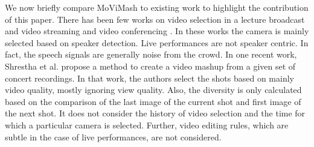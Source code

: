\documentclass{sig-alternate-05-2015}
\begin{document}
We now briefly compare MoViMash to existing work to highlight the contribution of this paper. There has been few works on
video selection in a lecture broadcast and video streaming \cite{21} \cite{6}
and video conferencing \cite{ref3}. In these works the camera is mainly
selected based on speaker detection. Live performances are not
speaker centric. In fact, the speech signals are generally noise from
the crowd. In one recent work, Shrestha et al.\cite{15} propose a
method to create a video mashup from a given set of concert recordings. In that work, the authors select the shots based on mainly
video quality, mostly ignoring view quality. Also, the diversity is
only calculated based on the comparison of the last image of the
current shot and first image of the next shot. It does not consider
the history of video selection and the time for which a particular
camera is selected. Further, video editing rules, which are subtle in
the case of live performances, are not considered.
\end{document}
